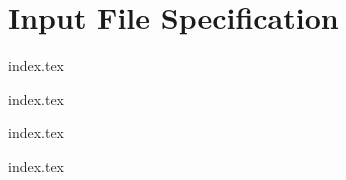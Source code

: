 
\chapter{Input File Specification}
{
	\lipsum[1]
	
	{index.tex}
	
	{index.tex}
	
	{index.tex}
	
	{index.tex}
}

